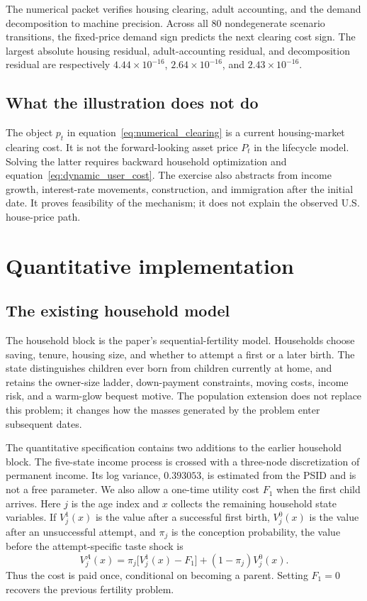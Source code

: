 \documentclass[11pt]{article}
\theoremstyle{definition}
\newcommand{\1}{\mathbf 1}
\begin{document}
The numerical packet verifies housing clearing, adult accounting, and the
demand decomposition to machine precision. Across all 80 nondegenerate
scenario transitions, the fixed-price demand sign predicts the next clearing
cost sign. The largest absolute housing residual, adult-accounting residual,
and decomposition residual are respectively $4.44\times10^{-16}$,
$2.64\times10^{-16}$, and $2.43\times10^{-16}$.

\subsection{What the illustration does not do}

The object $p_t$ in equation~\eqref{eq:numerical_clearing} is a current
housing-market clearing cost. It is not the forward-looking asset price $P_t$
in the lifecycle model. Solving the latter requires backward household
optimization and equation~\eqref{eq:dynamic_user_cost}. The exercise also
abstracts from income growth, interest-rate movements, construction, and
immigration after the initial date. It proves feasibility of the mechanism;
it does not explain the observed U.S. house-price path.

\fi

\section{Quantitative implementation}
\label{sec:quantitative_mapping}

\subsection{The existing household model}

The household block is the paper's sequential-fertility model. Households
choose saving, tenure, housing size, and whether to attempt a first or a later
birth. The state distinguishes children ever born from children currently at
home, and retains the owner-size ladder, down-payment constraints, moving
costs, income risk, and a warm-glow bequest motive. The population extension
does not replace this problem; it changes how the masses generated by the
problem enter subsequent dates.

The quantitative specification contains two additions to the earlier household
block. The five-state income process is crossed with a three-node discretization
of permanent income. Its log variance, \(0.393053\), is estimated from the PSID
and is not a free parameter. We also allow a one-time utility cost \(F_1\) when the
first child arrives. Here \(j\) is the age index and \(x\) collects the remaining
household state variables. If \(V_j^1(x)\) is the value after a successful first
birth, \(V_j^0(x)\) is the value after an unsuccessful attempt, and \(\pi_j\)
is the conception probability, the value before the attempt-specific taste
shock is
\begin{equation}
 V_j^A(x)=\pi_j\bigl[V_j^1(x)-F_1\bigr]+(1-\pi_j)V_j^0(x).
 \label{eq:first_birth_fixed_cost}
\end{equation}
Thus the cost is paid once, conditional on becoming a parent. Setting
\(F_1=0\) recovers the previous fertility problem.
\end{document}
